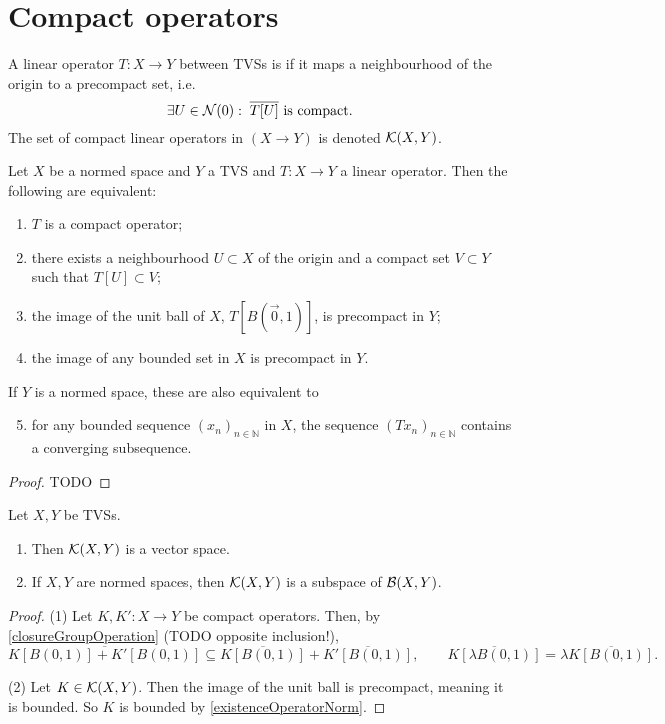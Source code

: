 \section{Compact operators}
\begin{definition}
A linear operator $T:X\to Y$ between TVSs is  if it maps a neighbourhood of the origin to a precompact set, i.e.\ 
\[ \exists U \in \operatorname{\mathcal{N}}(0): \;  \text{$\overline{T[U]}$ is compact.} \]
The set of compact linear operators in $(X\to Y)$ is denoted $\operatorname{\mathcal{K}}(X,Y)$.
\end{definition}

\begin{lemma} \label{compactOperatorEquivalents}
Let $X$ be a normed space and $Y$ a TVS and $T:X\to Y$ a linear operator. Then the following are equivalent:
\begin{enumerate}
\item $T$ is a compact operator;
\item there exists a neighbourhood $U \subset X$ of the origin and a compact set $V\subset Y$ such that $T[U] \subset V$;
\item the image of the unit ball of $X$, $T[B(\vec{0},1)]$, is precompact in $Y$;
\item the image of any bounded set in $X$ is precompact in $Y$.
\end{enumerate}
If $Y$ is a normed space, these are also equivalent to
\begin{enumerate} \setcounter{enumi}{4}
\item for any bounded sequence $(x_{n})_{n\in \mathbb{N}}$ in $X$, the sequence $(Tx_{n})_{n\in \mathbb{N} }$ contains a converging subsequence.
\end{enumerate}
\end{lemma}
\begin{proof}
TODO
\end{proof}


\begin{lemma}
Let $X,Y$ be TVSs.
\begin{enumerate}
\item Then $\operatorname{\mathcal{K}}(X, Y)$ is a vector space.
\item If $X,Y$ are normed spaces, then $\operatorname{\mathcal{K}}(X, Y)$ is a subspace of $\operatorname{\mathcal{B}}(X, Y)$.
\end{enumerate}
\end{lemma}
\begin{proof}
(1) Let $K,K':X\to Y$ be compact operators. Then, by \ref{closureGroupOperation} (TODO opposite inclusion!),
\[ \overline{K[B(0, 1)]+K'[B(0, 1)]} \subseteq \overline{K[B(0, 1)]}+\overline{K'[B(0, 1)]}, \qquad \overline{K[\lambda B(0, 1)]} = \lambda\overline{K[B(0, 1)]}. \]

(2) Let $K\in\operatorname{\mathcal{K}}(X, Y)$. Then the image of the unit ball is precompact, meaning it is bounded. So $K$ is bounded by \ref{existenceOperatorNorm}.
\end{proof}

